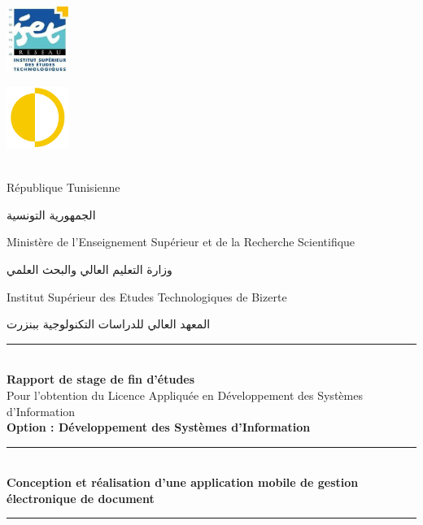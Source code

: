 \documentclass[a4paper,12pt]{report}
\begin{document}
\begin{titlepage}
    \centering
    \begin{minipage}{0cm}
        \begin{center}
            \includegraphics[width=2cm]{iset_logo.png}
        \end{center}
    \end{minipage}\hfill
    \begin{minipage}{10cm}
        \begin{flushright}
            \includegraphics[width=2cm]{neoledge_logo.png}\\
        \end{flushright}
    \end{minipage}\hfill\\
    {\small République Tunisienne }\\
    \begin{Arabic}
    الجمهورية التونسية \\
    \end{Arabic}
    {\small Ministère de l'Enseignement Supérieur et de la Recherche Scientifique  }\\
        \begin{Arabic}
          وزارة التعليم العالي والبحث العلمي   \\
    \end{Arabic}
    {\small Institut Supérieur des Etudes Technologiques de Bizerte  }\\
        \begin{Arabic}
          المعهد العالي للدراسات التكنولوجية ببنزرت   \\
    \end{Arabic}
\rule{\linewidth}{0.3mm} \\[0.4cm]

\vspace{5mm}
{\large \bfseries Rapport de stage de fin d’études}\\[0.5cm]
{\large Pour l'obtention du Licence Appliquée en Développement des Systèmes d’Information}\\[0.5cm]
{\large \bfseries{Option : Développement des Systèmes d'Information} \\ }
\vspace{10mm}
\rule{\linewidth}{0.3mm} \\[0.4cm]
{ \huge \bfseries Conception et réalisation d'une application mobile de gestion électronique de document\\[0.4cm] }
\rule{\linewidth}{0.3mm} \\[1cm]
\vspace{10mm}


\end{titlepage}
\end{document}
